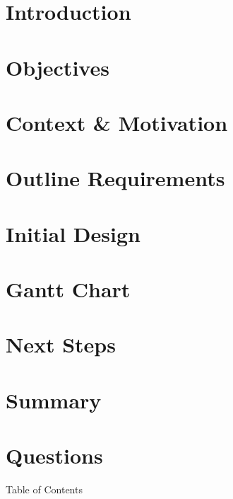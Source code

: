 



\begin{frame}
   \maketitle
\end{frame}

\section{Introduction}


\section{Objectives}


\section{Context \& Motivation}


\section{Outline Requirements}


\section{Initial Design}


\section{Gantt Chart}


\section{Next Steps}


\section{Summary}


\section{Questions}
\begin{frame}{Table of Contents}
   \tableofcontents
\end{frame}

